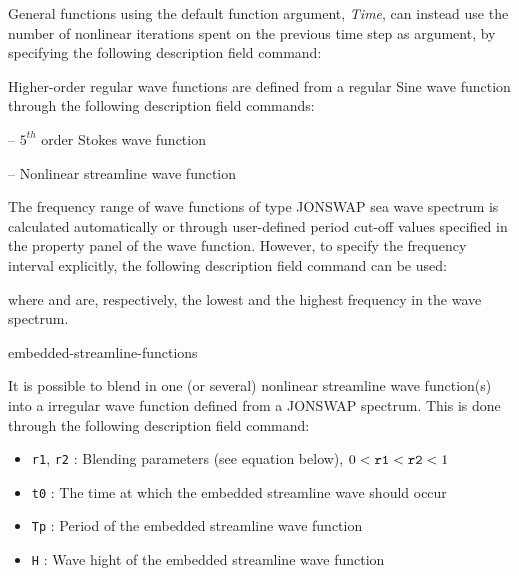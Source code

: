 General functions using the default function argument, {\sl Time}, can instead
use the number of nonlinear iterations spent on the previous time step as
argument, by specifying the following description field command:





Higher-order regular wave functions are defined from a regular Sine wave
function through the following description field commands:

\medskip
{}
\tabto{18mm} -- $5^{th}$ order Stokes wave function

\tabto{18mm} -- Nonlinear streamline wave function
\medskip



The frequency range of wave functions of type JONSWAP sea wave spectrum is
calculated automatically or through user-defined period cut-off values specified
in the property panel of the wave function. However, to specify the frequency
interval explicitly, the following description field command can be used:


\noindent
where  and  are, respectively,
the lowest and the highest frequency in the wave spectrum.


           {embedded-streamline-functions}

It is possible to blend in one (or several) nonlinear streamline wave
function(s) into a irregular wave function defined from a JONSWAP spectrum.
This is done through the following description field command:


\begin{itemize}
\item{\tt r1}, {\tt r2} :
  Blending parameters (see equation below), $0<{\tt r1}<{\tt r2}<1$
\item{\tt t0} :
  The time at which the embedded streamline wave should occur
\item{\tt Tp} :
  Period of the embedded streamline wave function
\item{\tt H} :
  Wave hight of the embedded streamline wave function
\end{itemize}

